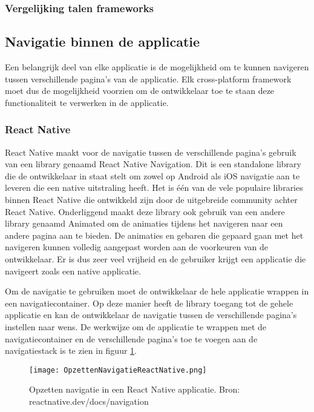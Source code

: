 \subsubsection{Vergelijking talen frameworks}
\label{subsubse:vglTalen}



\subsection{Navigatie binnen de applicatie}
\label{subsec:navigatieApplicatie}

Een belangrijk deel van elke applicatie is de mogelijkheid om te kunnen navigeren tussen verschillende pagina's van de applicatie. Elk cross-platform framework moet dus de mogelijkheid voorzien om de ontwikkelaar toe te staan deze functionaliteit te verwerken in de applicatie.

\subsubsection{React Native}
\label{subsubsec:navigatieReactNative}

React Native maakt voor de navigatie tussen de verschillende pagina's gebruik van een library genaamd React Native Navigation. Dit is een standalone library die de ontwikkelaar in staat stelt om zowel op Android als iOS navigatie aan te leveren die een native uitstraling heeft. Het is één van de vele populaire libraries binnen React Native die ontwikkeld zijn door de uitgebreide community achter React Native. Onderliggend maakt deze library ook gebruik van een andere library genaamd Animated om de animaties tijdens het navigeren naar een andere pagina aan te bieden. De animaties en gebaren die gepaard gaan met het navigeren kunnen volledig aangepast worden aan de voorkeuren van de ontwikkelaar. Er is dus zeer veel vrijheid en de gebruiker krijgt een applicatie die navigeert zoals een native applicatie. 

Om de navigatie te gebruiken moet de ontwikkelaar de hele applicatie wrappen in een navigatiecontainer. Op deze manier heeft de library toegang tot de gehele applicatie en kan de ontwikkelaar de navigatie tussen de verschillende pagina's instellen naar wens. De werkwijze om de applicatie te wrappen met de navigatiecontainer en de verschillende pagina's toe te voegen aan de navigatiestack is te zien in figuur \ref{fig:opzettenNavigatieReactNative}.

\begin{figure}
    \texttt{[image: OpzettenNavigatieReactNative.png]}
    \caption{Opzetten navigatie in een React Native applicatie. Bron: reactnative.dev/docs/navigation}
    \label{fig:opzettenNavigatieReactNative}
\end{figure}

